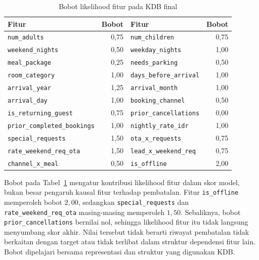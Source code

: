 \begin{table}[H]
    \centering
    \caption{Bobot likelihood fitur pada KDB final}
    \label{tab:nb-feature-weights}
    \small
    \begin{tabular}{lr|lr}
        \hline
        Fitur                               & Bobot & Fitur                          & Bobot \\
        \hline
        \texttt{num\_adults}                & 0,75  & \texttt{num\_children}         & 0,75  \\
        \texttt{weekend\_nights}            & 0,50  & \texttt{weekday\_nights}       & 1,00  \\
        \texttt{meal\_package}              & 0,25  & \texttt{needs\_parking}        & 0,50  \\
        \texttt{room\_category}             & 1,00  & \texttt{days\_before\_arrival} & 1,00  \\
        \texttt{arrival\_year}              & 1,25  & \texttt{arrival\_month}        & 1,00  \\
        \texttt{arrival\_day}               & 1,00  & \texttt{booking\_channel}      & 0,50  \\
        \texttt{is\_returning\_guest}       & 0,75  & \texttt{prior\_cancellations}  & 0,00  \\
        \texttt{prior\_completed\_bookings} & 1,00  & \texttt{nightly\_rate\_idr}    & 1,00  \\
        \texttt{special\_requests}          & 1,50  & \texttt{ota\_x\_requests}      & 0,75  \\
        \texttt{rate\_weekend\_req\_ota}    & 1,50  & \texttt{lead\_x\_weekend\_req} & 0,75  \\
        \texttt{channel\_x\_meal}           & 0,50  & \texttt{is\_offline}           & 2,00  \\
        \hline
    \end{tabular}
\end{table}

Bobot pada Tabel~\ref{tab:nb-feature-weights} mengatur kontribusi
likelihood fitur dalam skor model, bukan besar pengaruh kausal fitur
terhadap pembatalan. Fitur \texttt{is\_offline} memperoleh bobot $2{,}00$,
sedangkan \texttt{special\_requests} dan
\texttt{rate\_weekend\_req\_ota} masing-masing memperoleh $1{,}50$.
Sebaliknya, bobot \texttt{prior\_cancellations} bernilai nol, sehingga
likelihood fitur itu tidak langsung menyumbang skor akhir. Nilai tersebut
tidak berarti riwayat pembatalan tidak berkaitan dengan target atau
tidak terlibat dalam struktur dependensi fitur lain. Bobot dipelajari
bersama representasi dan struktur yang digunakan KDB.

